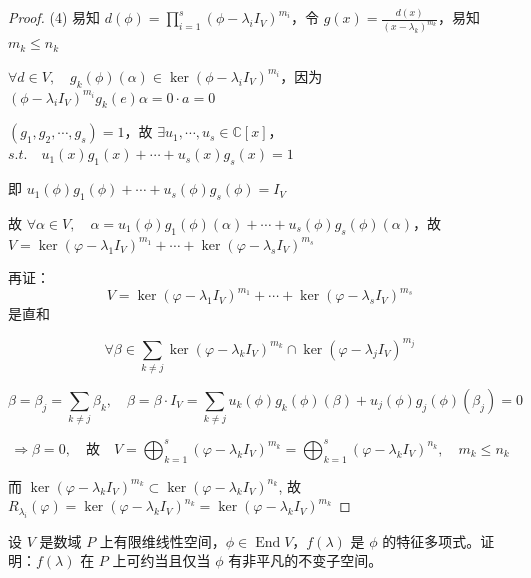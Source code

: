 \documentclass[lang=cn,12pt]{elegantbook}
\begin{document}
\begin{proof}
    (4) 易知 \( d(\phi) =  \prod_{i= 1}^s (\phi - \lambda_i I_V)^{m_i} \)，令 \( g(x) = \frac{d(x)}{(x-\lambda_k)^{m_k}} \)，易知$m_k \leq n_k$

    \( \forall d \in V, \quad g_k(\phi)(\alpha) \in \ker (\phi - \lambda_i I_V)^{m_i} \)，因为 \((\phi - \lambda_i I_V)^{m_i} g_k(e)\alpha = 0\cdot a = 0\)
    
    \((g_1, g_2, \cdots, g_s) = 1\)，故 \(\exists u_1, \cdots, u_s \in \mathbb{C}[x]\)，\( s.t. \quad u_1(x) g_1(x) + \cdots + u_s(x) g_s(x) = 1\)
    
    即 \( u_1(\phi)g_1(\phi) + \cdots + u_s(\phi)g_s(\phi) = I_V \)
    
    故 \( \forall \alpha \in V, \quad \alpha = u_1(\phi)g_1(\phi)(\alpha) + \cdots + u_s(\phi)g_s(\phi)(\alpha) \)，故 \( V = \ker(\varphi - \lambda_1 I_V)^{m_1} + \cdots + \ker(\varphi - \lambda_s I_V)^{m_s} \)
    
    再证：  
    \[ V = \ker(\varphi - \lambda_1 I_V)^{m_1} + \cdots + \ker(\varphi - \lambda_s I_V)^{m_s} \] 是直和  
    
    \[\forall \beta \in \sum_{k\neq j} \ker(\varphi - \lambda_k I_V)^{m_k} \cap \ker(\varphi - \lambda_j I_V)^{m_j} \]
    
    \[\beta = \beta_j = \sum_{k \neq j} \beta_k, \quad \beta = \beta \cdot I_V = \sum_{k\neq j} u_k(\phi)g_k(\phi)(\beta) + u_j(\phi) g_j(\phi)(\beta_j) = 0\]
    
    \[\Rightarrow \beta = 0, \quad \text{故} \quad V = \bigoplus_{k=1}^s (\varphi - \lambda_k I_V)^{m_k} = \bigoplus_{k=1}^s (\varphi - \lambda_k I_V)^{n_k}, \quad m_k \leq n_k\]
    
    而 \(\ker(\varphi - \lambda_k I_V)^{m_k} \subset \ker(\varphi - \lambda_k I_V)^{n_k}\), 故 \(R_{\lambda_i}(\varphi) = \ker(\varphi - \lambda_k I_V)^{n_k} = \ker(\varphi - \lambda_k I_V)^{m_k}\)
\end{proof}

\begin{example}
    设 \(V\) 是数域 \(P\) 上有限维线性空间，\(\phi \in \operatorname{End}V\)，\(f(\lambda)\) 是 \(\phi\) 的特征多项式。证明：\(f(\lambda)\) 在 \(P\) 上可约当且仅当 \(\phi\) 有非平凡的不变子空间。
\end{example}
\end{document}
